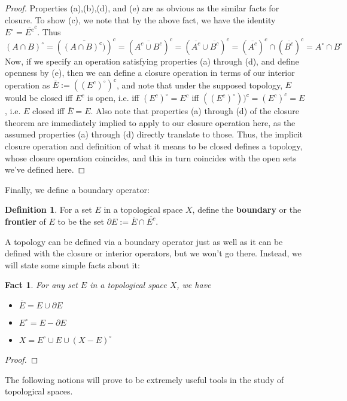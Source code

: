 \documentclass{article}
\theoremstyle{definition}
\newtheorem{definition}{Definition}[section]
\theoremstyle{plain}
\theoremstyle{theorem}
\newtheorem{fact}{Fact}[section]
\begin{document}
	\begin{proof}
		Properties (a),(b),(d), and (e) are as obvious as the similar facts for closure. To show (c), we note that by the above fact, we have the identity $E^{\circ} = \overline{E^c}^c$. Thus
		\[ (A \cap B)^{\circ} = (\overline{(A \cap B)^c)})^c = (\overline{A^c \cup B^c})^c = (\overline{A^c} \cup \overline{B^c})^c = (\overline{A^c})^c \cap (\overline{B^c})^c = A^{\circ} \cap B^{\circ} \]
		Now, if we specify an operation satisfying properties (a) through (d), and define openness by (e), then we can define a closure operation in terms of our interior operation as $\bar{E} := ((E^c)^{\circ})^c$, and note that under the supposed topology, $E$ would be closed iff $E^c$ is open, i.e. iff $(E^c)^{\circ} = E^c$ iff $((E^c)^{\circ}))^c = (E^c)^c = E$, i.e. $E$ closed iff $\bar{E} = E$. Also note that properties (a) through (d) of the closure theorem are immediately implied to apply to our closure operation here, as the assumed properties (a) through (d) directly translate to those. Thus, the implicit closure operation and definition of what it means to be closed defines a topology, whose closure operation coincides, and this in turn coincides with the open sets we've defined here.
	\end{proof}
	Finally, we define a boundary operator:
	\begin{definition}
		For a set $E$ in a topological space $X$, define the \textbf{boundary} or the \textbf{frontier} of $E$ to be the set $\partial E := \overline{E} \cap \overline{E^c}$.
	\end{definition}
	A topology can be defined via a boundary operator just as well as it can be defined with the closure or interior operators, but we won't go there. Instead, we will state some simple facts about it:
	\begin{fact}
		For any set $E$ in a topological space $X$, we have
		\begin{itemize}
			\item[(a)] $\overline{E} = E \cup \partial E $
			\item[(b)] $E^{\circ} = E - \partial E$
			\item[(c)] $X = E^{\circ} \cup E \cup (X-E)^{\circ}$
		\end{itemize}
	\end{fact}
	\begin{proof}
		
	\end{proof}
	\par The following notions will prove to be extremely useful tools in the study of topological spaces.
\end{document}
